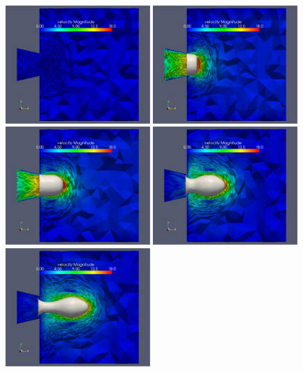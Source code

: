 \begin{figure} \centering
  \includegraphics[width=0.49\textwidth]{figures/fig2a.eps}
  \includegraphics[width=0.49\textwidth]{figures/fig2b.eps}
  \includegraphics[width=0.49\textwidth]{figures/fig2c.eps}
  \includegraphics[width=0.49\textwidth]{figures/fig2d.eps}
  \includegraphics[width=0.49\textwidth]{figures/fig2e.eps}

\end{figure}
